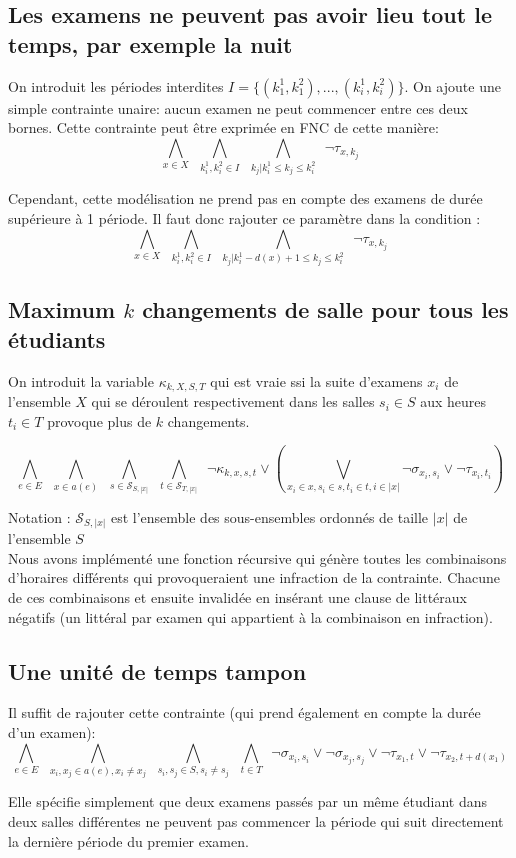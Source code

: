 \documentclass[a4paper]{article}
\begin{document}
\subsection{Les examens ne peuvent pas avoir lieu tout le temps, par exemple la nuit}
On introduit les périodes interdites $I = \{(k_1^1, k_1^2), ..., (k_{i}^{1},k_{i}^{2})\}$.
On ajoute une simple contrainte unaire: aucun examen ne peut commencer entre ces deux bornes. Cette contrainte peut être exprimée en FNC de cette manière:
$$ \bigwedge\limits_{x \in X} \,\,\,
  \bigwedge\limits_{k_i^1, k_i^2 \in I}\,\,\,
  \bigwedge\limits_{k_j | k_i^1 \leq k_j \leq k_i^2} \,\,\,
  \lnot \tau_{x,k_j}$$

Cependant, cette modélisation ne prend pas en compte des examens de durée supérieure à 1 période. Il faut donc rajouter ce paramètre dans la condition :
$$ \bigwedge\limits_{x \in X} \,\,\,
  \bigwedge\limits_{k_i^1, k_i^2 \in I}\,\,\,
  \bigwedge\limits_{k_j | k_i^1-d(x)+1 \leq k_j \leq k_i^2} \,\,\,
  \lnot \tau_{x,k_j}$$

\subsection{Maximum $k$ changements de salle pour tous les étudiants}
  On introduit la variable $\kappa_{k, X, S, T}$ qui est vraie ssi la suite d'examens $x_i$ de l'ensemble $X$ qui se déroulent respectivement dans les salles $s_i \in S$ aux heures $t_i \in T$ provoque plus de $k$ changements.

  $$  \bigwedge\limits_{e \in E} \,\,\,
      \bigwedge\limits_{x \in a(e)} \,\,\,
      \bigwedge\limits_{s \in \mathcal{S}_{S, |x|}} \,\,\,
      \bigwedge\limits_{t \in \mathcal{S}_{T, |x|}} \,\,\,
      \lnot \kappa_{k, x, s, t} \lor
      (\bigvee\limits_{x_i \in x, s_i \in s, t_i \in t, i \in |x|} 
       \lnot \sigma_{x_i, s_i} \lor \lnot \tau_{x_i, t_i}) $$

  Notation : $\mathcal{S}_{S, |x|}$ est l'ensemble des sous-ensembles ordonnés de taille $|x|$ de l'ensemble $S$\\

  Nous avons implémenté une fonction récursive qui génère toutes les combinaisons d'horaires différents qui provoqueraient une infraction de la contrainte. Chacune de ces combinaisons et ensuite invalidée en insérant une clause de littéraux négatifs (un littéral par examen qui appartient à la combinaison en infraction).

\subsection{Une unité de temps tampon}
  Il suffit de rajouter cette contrainte (qui prend également en compte la durée d'un examen):
  $$  \bigwedge\limits_{e \in E} \,\,\,
      \bigwedge\limits_{x_i, x_j \in a(e), x_i \neq x_j} \,\,\,
      \bigwedge\limits_{s_i, s_j \in S, s_i \neq s_j} \,\,\,
      \bigwedge\limits_{t \in T} \,\,\,
      \lnot \sigma_{x_i, s_i} \lor \lnot \sigma_{x_j, s_j}
      \lor \lnot \tau_{x_1, t} \lor \lnot \tau_{x_2, t+d(x_1)} $$

  Elle spécifie simplement que deux examens passés par un même étudiant dans deux salles différentes ne peuvent pas commencer la période qui suit directement la dernière période du premier examen.
\end{document}

